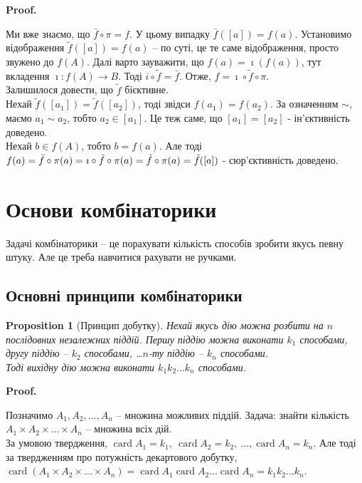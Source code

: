 \documentclass[a4paper, 14pt]{extarticle}
\makeatletter
\theoremstyle{theoremdd}
\theoremstyle{theoremdd}
\theoremstyle{theoremdd}
\theoremstyle{theoremdd}
\theoremstyle{theoremdd}
\theoremstyle{theoremdd}
\theoremstyle{theoremdd}
\theoremstyle{theoremdd}
\theoremstyle{theoremdd}
\newtheorem{proposition}[theorem]{Proposition}
\theoremstyle{theoremdd}
\theoremstyle{theoremdd}
\theoremstyle{theoremdd}
\theoremstyle{theoremdd}
\theoremstyle{theoremdd}
\theoremstyle{theoremdd}
\renewenvironment{proof}[1][Proof.\\]{\par
\pushQED{\hfill \qed}%
\normalfont \topsep6\p@\@plus6\p@\relax
\trivlist
\item\relax
{\bfseries
#1\@addpunct{.}}\hspace\labelsep\ignorespaces
}{%
\popQED\endtrivlist\@endpefalse
}
\DeclareMathOperator{\card}{card}
\makeatother
\begin{document}
\begin{proof}
Ми вже знаємо, що $\bar{f} \circ \pi = f$. У цьому випадку $\bar{f}([a]) = f(a)$. Установимо відображення $\tilde{f}([a]) = f(a)$ -- по суті, це те саме відображення, просто звужено до $f(A)$. Далі варто зауважити, що $f(a) = \imath (f(a))$, тут вкладення $\imath \colon f(A) \to B$. Тоді $i \circ \tilde{f} = \bar{f}$. Отже, $f = \imath \circ \tilde{f} \circ \pi$.\\
Залишилося довести, що $\tilde{f}$ бієктивне.\\
Нехай $\tilde{f}([a_1]) = \tilde{f}([a_2])$, тоді звідси $f(a_1) = f(a_2)$. За означенням $\sim$, маємо $a_1 \sim a_2$, тобто $a_2 \in [a_1]$. Це теж саме, що $[a_1] = [a_2]$ - ін'єктивність доведено.\\
Нехай $b \in f(A)$, тобто $b = f(a)$. Але тоді $f(a) = \bar{f} \circ \pi (a) = \imath \circ \tilde{f} \circ \pi(a) \\ = \tilde{f} \circ \pi(a) = \tilde{f}([a])$ - сюр'єктивність доведено.
\end{proof}
\newpage

\section{Основи комбінаторики}
Задачі комбінаторики -- це порахувати кількість способів зробити якусь певну штуку. Але це треба навчитися рахувати не ручками.

\subsection{Основні принципи комбінаторики}
\begin{proposition}[Принцип добутку]
Нехай якусь дію можна розбити на $n$ послідовних незалежних піддій. Першу піддію можна виконати $k_1$ способами, другу піддію -- $k_2$ способами, \dots $n$-ту піддію -- $k_n$ способами.\\
Тоді вихідну дію можна виконати $k_1 k_2 \dots k_n$ способами.
\end{proposition}

\begin{proof}
Позначимо $A_1,A_2,\dots,A_n$ -- множина можливих піддій. Задача: знайти кількість $A_1 \times A_2 \times \dots \times A_n$ -- множина всіх дій. \\
За умовою твердження, $\card A_1 = k_1,\ \card A_2 = k_2,\ \dots, \card A_n = k_n$. Але тоді за твердженням про потужність декартового добутку,\\
$\card(A_1 \times A_2 \times \dots \times A_n) = \card A_1 \card A_2 \dots \card A_n = k_1 k_2 \dots k_n$.
\end{proof}
\end{document}

